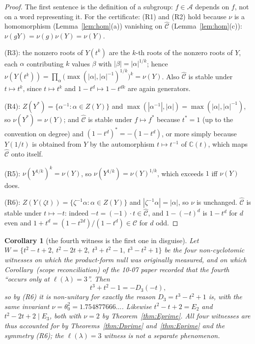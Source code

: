 \documentclass[11pt]{article}
\newtheorem{corollary}[theorem]{Corollary}
\theoremstyle{definition}
\newcommand{\CC}{\mathbb{C}}
\newcommand{\lam}{\lambda}
\newcommand{\Chat}{\widehat{\mathcal{C}}}
\begin{document}
\begin{proof}
The first sentence is the definition of a subgroup: $f\in\mathcal{A}$ depends on $f$, not on a
word representing it. For the certificate: (R1) and (R2) hold because $\nu$ is a homomorphism
(Lemma~\ref{lem:hom}(a)) vanishing on $\Chat$ (Lemma~\ref{lem:hom}(c)):
$\nu(gY)=\nu(g)\nu(Y)=\nu(Y)$.

(R3): the nonzero roots of $Y(t^{k})$ are the $k$-th roots of the nonzero roots of $Y$, each
$\alpha$ contributing $k$ values $\beta$ with $|\beta|=|\alpha|^{1/k}$; hence
$\nu(Y(t^{k}))=\prod_{\alpha}\bigl(\max(|\alpha|,|\alpha|^{-1})^{1/k}\bigr)^{k}=\nu(Y)$. Also
$\Chat$ is stable under $t\mapsto t^{k}$, since $t\mapsto t^{k}$ and
$1-t^{d}\mapsto1-t^{dk}$ are again generators.

(R4): $Z(Y^{*})=\{\alpha^{-1}:\alpha\in Z(Y)\}$ and $\max(|\alpha^{-1}|,|\alpha|)=
\max(|\alpha|,|\alpha|^{-1})$, so $\nu(Y^{*})=\nu(Y)$; and $\Chat$ is stable under $f\mapsto f^*$
because $t^*=1$ (up to the convention on degree) and $(1-t^{d})^{*}=-(1-t^{d})$, or more simply
because $Y(1/t)$ is obtained from $Y$ by the automorphism $t\mapsto t^{-1}$ of $\CC(t)$, which
maps $\Chat$ onto itself.

(R5): $\nu(Y^{1/k})^{k}=\nu(Y)$, so $\nu(Y^{1/k})=\nu(Y)^{1/k}$, which exceeds $1$ iff
$\nu(Y)$ does.

(R6): $Z(Y(\zeta t))=\{\zeta^{-1}\alpha:\alpha\in Z(Y)\}$ and $|\zeta^{-1}\alpha|=|\alpha|$, so
$\nu$ is unchanged. $\Chat$ is stable under $t\mapsto-t$: indeed $-t=(-1)\cdot t\in\Chat$, and
$1-(-t)^{d}$ is $1-t^{d}$ for $d$ even and $1+t^{d}=(1-t^{2d})/(1-t^{d})\in\mathcal{C}$ for $d$
odd.
\end{proof}

\begin{corollary}[the fourth witness is the first one in disguise]\label{cor:fourth}
Let $W=\{t^2-t+2,\ t^2-2t+2,\ t^3+t^2-1,\ t^3-t^2+1\}$ be the four non-cyclotomic witnesses on
which the product-form null was originally measured, and on which
Corollary~\textup{(scope reconciliation)} of the 10-07 paper recorded that the fourth
``occurs only at $\ell(\lam)=3$''. Then
\[
  t^{3}+t^{2}-1=-D_3(-t),
\]
so by \textup{(R6)} it is non-unitary for exactly the reason $D_3=t^{3}-t^{2}+1$ is, with the same
invariant $\nu=\theta_0^{2}=1.754877666\ldots$. Likewise $t^2-t+2=E_2$ and
$t^{2}-2t+2\mid E_3$, both with $\nu=2$ by Theorem~\ref{thm:Eprime}. All four witnesses are thus
accounted for by Theorems~\ref{thm:Dprime} and~\ref{thm:Eprime} and the symmetry
\textup{(R6)}; the $\ell(\lam)=3$ witness is not a separate phenomenon.
\end{corollary}
\end{document}
